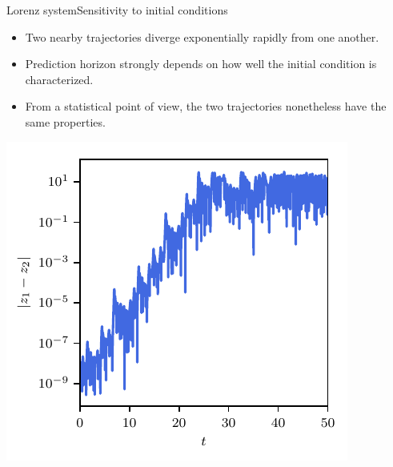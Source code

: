 \documentclass[usenames,dvipsnames,svgnames,10pt,aspectratio=169]{beamer}
\begin{document}
\begin{frame}[t, c]{Lorenz system}{Sensitivity to initial conditions}
	\begin{minipage}{.48\textwidth}
		\begin{itemize}
			\item Two nearby trajectories diverge exponentially rapidly from one another.

			\bigskip

			\item Prediction horizon strongly depends on how well the initial condition is characterized.

			\bigskip

			\item From a statistical point of view, the two trajectories nonetheless have the same properties.
		\end{itemize}
	\end{minipage}%
	\hfill
	\begin{minipage}{.48\textwidth}
		\centering
		\includegraphics[width=.8\textwidth]{sensitivity_initial_conditions_bis}
	\end{minipage}

	\vspace{1cm}
\end{frame}
\end{document}
